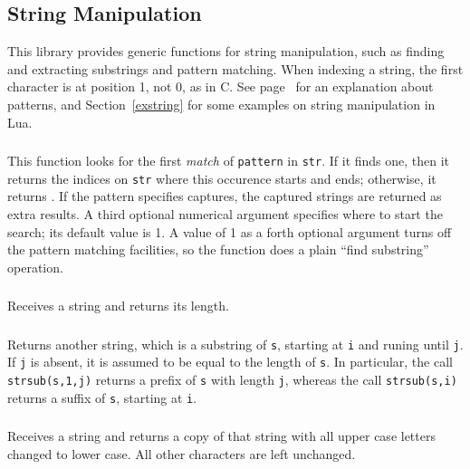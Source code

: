 \subsection{String Manipulation}
This library provides generic functions for string manipulation,
such as finding and extracting substrings and pattern matching.
When indexing a string, the first character is at position 1,
not 0, as in C.
See page~\pageref{pm} for an explanation about patterns,
and Section~\ref{exstring} for some examples on string manipulation
in Lua.

\subsubsection*{}
This function looks for the first {\em match\/} of
\verb-pattern- in \verb-str-.
If it finds one, then it returns the indices on \verb-str-
where this occurence starts and ends;
otherwise, it returns \nil.
If the pattern specifies captures,
the captured strings are returned as extra results.
A third optional numerical argument specifies where to start the search;
its default value is 1.
A value of 1 as a forth optional argument
turns off the pattern matching facilities,
so the function does a plain ``find substring'' operation.

\subsubsection*{}
Receives a string and returns its length.

\subsubsection*{}
Returns another string, which is a substring of \verb's',
starting at \verb'i'  and runing until \verb'j'.
If \verb'j' is absent,
it is assumed to be equal to the length of \verb's'.
In particular, the call \verb'strsub(s,1,j)' returns a prefix of \verb's'
with length \verb'j',
whereas the call \verb'strsub(s,i)' returns a suffix of \verb's',
starting at \verb'i'.

\subsubsection*{}
Receives a string and returns a copy of that string with all
upper case letters changed to lower case.
All other characters are left unchanged.

